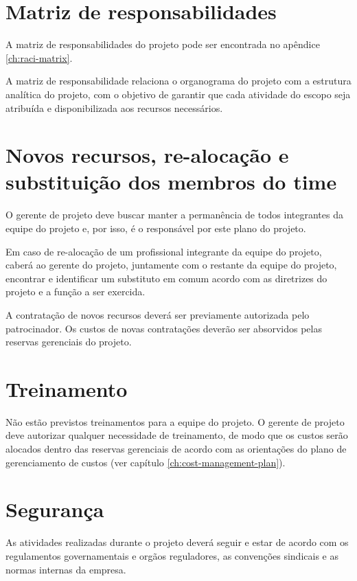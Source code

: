 \section{Matriz de responsabilidades}

A matriz de responsabilidades do projeto pode ser encontrada no apêndice \ref{ch:raci-matrix}.

A matriz de responsabilidade relaciona o organograma do projeto com a estrutura analítica do projeto, com o objetivo de garantir que cada atividade do escopo seja atribuída e disponibilizada aos recursos necessários.

\section{Novos recursos, re-alocação e substituição dos membros do time}

O gerente de projeto deve buscar manter a permanência de todos integrantes da equipe do projeto e, por isso, é o responsável por este plano do projeto.

Em caso de re-alocação de um profissional integrante da equipe do projeto, caberá ao gerente do projeto, juntamente com o restante da equipe do projeto, encontrar e identificar um substituto em comum acordo com as diretrizes do projeto e a função a ser exercida. 

A contratação de novos recursos deverá ser previamente autorizada pelo patrocinador. Os custos de novas contratações deverão ser absorvidos pelas reservas gerenciais do projeto.

\section{Treinamento}

Não estão previstos treinamentos para a equipe do projeto. O gerente de projeto deve autorizar qualquer necessidade de treinamento, de modo que os custos serão alocados dentro das reservas gerenciais de acordo com as orientações do plano de gerenciamento de custos (ver capítulo \ref{ch:cost-management-plan}).

\section{Segurança}

As atividades realizadas durante o projeto deverá seguir e estar de acordo com os regulamentos governamentais e orgãos reguladores, as convenções sindicais e as normas internas da empresa.

